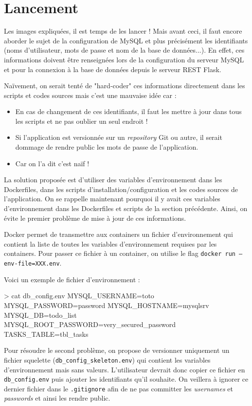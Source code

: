 \documentclass[11pt,a4paper,oneside]{report}
\newcommand{\code}[1]{\texttt{#1}}
\begin{document}
\section{Lancement}\label{sc-lancement}
Les images expliquées, il est temps de les lancer ! Mais avant ceci, il faut encore aborder le sujet de la configuration de MySQL et plus précisément les identifiants (noms d'utilisateur, mots de passe et nom de la base de données...). En effet, ces informations doivent être renseignées lors de la configuration du serveur MySQL et pour la connexion à la base de données depuis le serveur REST Flask.

Naïvement, on serait tenté de "hard-coder" ces informations directement dans les scripts et codes sources mais c'est une mauvaise idée car :
\begin{itemize}
\item En cas de changement de ces identifiants, il faut les mettre à jour dans tous les scripts et ne pas oublier un seul endroit !
\item Si l'application est versionnée sur un \textit{repository} Git ou autre, il serait dommage de rendre public les mots de passe de l'application.
\item Car on l'a dit c'est naïf !
\end{itemize}

La solution proposée est d'utiliser des variables d'environnement dans les Dockerfiles, dans les scripts d'installation/configuration et les codes sources de l'application. On se rappelle maintenant pourquoi il y avait ces variables d'environnement dans les Dockerfiles et scripts de la section précédente. Ainsi, on évite le premier problème de mise à jour de ces informations.

Docker permet de transmettre aux containers un fichier d'environnement qui contient la liste de toutes les variables d'environnement requises par les containers. Pour passer ce fichier à un container, on utilise le flag \code{docker run --env-file=XXX.env}.

Voici un exemple de fichier d'environnement :
\begin{bashcode}
> cat db_config.env
MYSQL_USERNAME=toto
MYSQL_PASSWORD=password
MYSQL_HOSTNAME=mysqlsrv
MYSQL_DB=todo_list
MYSQL_ROOT_PASSWORD=very_secured_password
TASKS_TABLE=tbl_tasks
\end{bashcode}
Pour résoudre le second problème, on propose de versionner uniquement un fichier squelette  \break(\code{db\_config\_skeleton.env}) qui contient les variables d'environnement mais sans valeurs. L'utilisateur devrait donc copier ce fichier en \code{db\_config.env} puis ajouter les identifiants qu'il souhaite. On veillera à ignorer ce dernier fichier dans le \code{.gitignore} afin de ne pas committer les \textit{usernames} et \textit{passwords} et ainsi les rendre public.
\end{document}
